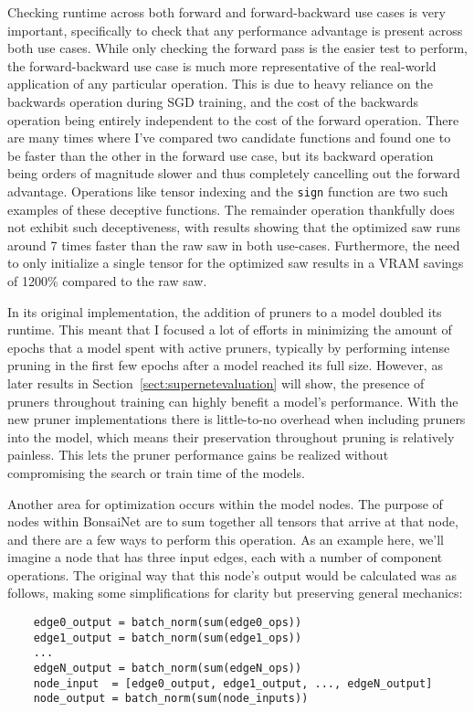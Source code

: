 Checking runtime across both forward and forward-backward use cases is very important, specifically to check that
any performance advantage is present across both use cases. While only checking the forward pass is
the easier test to perform, the forward-backward use case is much more representative of the real-world application of any
particular operation. This is due to heavy reliance on the backwards operation during SGD training, and the cost
of the backwards operation being entirely independent to the cost of the forward operation. There are many times where
I've compared two candidate functions and found one to be faster than the other in the forward use case,
but its backward operation being orders of magnitude slower and thus completely cancelling out the forward advantage.
Operations like tensor indexing and the \texttt{sign} function are two such examples of these deceptive functions.
The remainder operation thankfully does not exhibit such deceptiveness, with results showing that the optimized saw runs
around 7 times faster than the raw saw in both use-cases. Furthermore, the need to only initialize a single tensor for
the optimized saw results in a VRAM savings of 1200\% compared to the raw saw.

In its original implementation, the addition of pruners to a model doubled its runtime. This meant that I focused a lot
of efforts in minimizing the amount of epochs that a model spent with active pruners, typically by performing intense
pruning in the first few epochs after a model reached its full size. However, as later results in
Section~\ref{sect:supernetevaluation} will show, the presence of pruners throughout training can highly benefit a model's
performance. With the new pruner implementations there is little-to-no overhead when including pruners into the model, which
means their preservation throughout pruning is relatively painless. This lets the pruner performance gains be realized
without compromising the search or train time of the models.


Another area for optimization occurs within the model nodes. The purpose of nodes within BonsaiNet are to sum
together all tensors that arrive at that node, and there are a few ways to perform this operation. As an example here,
we'll imagine a node that has three input edges, each with a number of component operations. The original way that
this node's output would be calculated was as follows, making some simplifications for clarity but preserving general
mechanics:

\begin{Verbatim}
	edge0_output = batch_norm(sum(edge0_ops))
	edge1_output = batch_norm(sum(edge1_ops))
	...
	edgeN_output = batch_norm(sum(edgeN_ops))
	node_input  = [edge0_output, edge1_output, ..., edgeN_output]
	node_output = batch_norm(sum(node_inputs))
\end{Verbatim}

